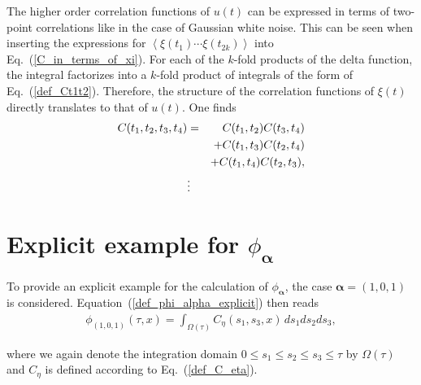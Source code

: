 \documentclass[aps,twocolumn,superscriptaddress,showpacs,showkeys]{revtex4}
\newcommand{\vecalpha}{{\boldsymbol{\alpha}}}
\begin{document}
\noindent The higher order correlation functions of $u(t)$ can be expressed in terms of two-point correlations like
in the case of Gaussian white noise. This can be seen when inserting the expressions for
$\left<\xi(t_1)\cdots\xi(t_{2k})\right>$ into Eq.~(\ref{C_in_terms_of_xi}). For each of the $k$-fold products of the delta
function, the integral factorizes into a $k$-fold product of integrals of the form of Eq.~(\ref{def_Ct1t2}). Therefore,
the structure of the correlation functions of $\xi(t)$ directly translates to that of $u(t)$. One finds
%
\begin{eqnarray}
C(t_1,t_2,t_3,t_4) &=& C(t_1,t_2)C(t_3,t_4)\cr
                   &&+C(t_1,t_3)C(t_2,t_4)\cr
                   &&+C(t_1,t_4)C(t_2,t_3),\\
&\vdots&\nonumber
\end{eqnarray}


\section{Explicit example for $\phi_\vecalpha$}
\label{app_example_phialpha}

\noindent To provide an explicit example for the calculation of $\phi_\vecalpha$, the case $\vecalpha=(1,0,1)$ is considered.
Equation~(\ref{def_phi_alpha_explicit}) then reads
%
\begin{eqnarray}
\phi_{(1,0,1)}(\tau,x) = \int_{\Omega(\tau)}\!\!\! C_\eta(s_1,s_3,x) \,ds_1 ds_2 ds_3,
\end{eqnarray}

\noindent where we again denote the integration domain $0\le s_1 \le s_2 \le s_3 \le \tau$ by $\Omega(\tau)$ and $C_\eta$ is
defined according to Eq.~(\ref{def_C_eta}).
\end{document}
